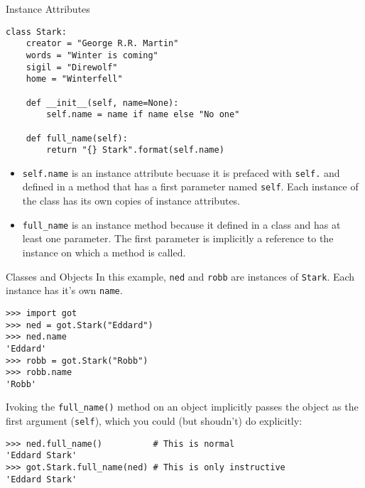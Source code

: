\documentclass[smaller]{beamer}
\begin{document}
\begin{frame}[fragile,label=sec-1-4]{Instance Attributes}
 \lstset{language=Python,label= ,caption= ,numbers=none}
\begin{lstlisting}
class Stark:
    creator = "George R.R. Martin"
    words = "Winter is coming"
    sigil = "Direwolf"
    home = "Winterfell"

    def __init__(self, name=None):
        self.name = name if name else "No one"

    def full_name(self):
        return "{} Stark".format(self.name)
\end{lstlisting}

\begin{itemize}
\item \verb~self.name~ is an instance attribute becuase it is prefaced with \verb~self.~ and defined in a method that has a first parameter named \verb~self~. Each instance of the class has its own copies of instance attributes.
\item \verb~full_name~ is an instance method because it defined in a class and has at least one parameter. The first parameter is implicitly a reference to the instance on which a method is called.
\end{itemize}
\end{frame}

\begin{frame}[fragile,label=sec-1-5]{Classes and Objects}
 In this example, \verb~ned~ and \verb~robb~ are \alert{instances} of \verb~Stark~. Each instance has it's own \verb~name~.

\lstset{language=Python,label= ,caption= ,numbers=none}
\begin{lstlisting}
>>> import got
>>> ned = got.Stark("Eddard")
>>> ned.name
'Eddard'
>>> robb = got.Stark("Robb")
>>> robb.name
'Robb'
\end{lstlisting}

Ivoking the \verb~full_name()~ method on an object implicitly passes the object as the first argument (\verb~self~), which you could (but shoudn't) do explicitly:

\lstset{language=Python,label= ,caption= ,numbers=none}
\begin{lstlisting}
>>> ned.full_name()          # This is normal
'Eddard Stark'
>>> got.Stark.full_name(ned) # This is only instructive
'Eddard Stark'
\end{lstlisting}
\end{frame}
\end{document}

